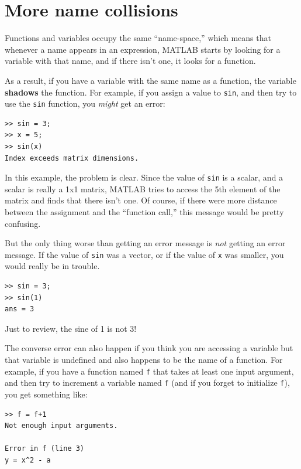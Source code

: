 \documentclass[
]{book}
\begin{document}
\section{More name collisions}

Functions and variables occupy the same ``name-space,'' which means
that whenever a name appears in an expression, MATLAB starts by looking
for a variable with that name, and if there isn't one, it looks for
a function.

As a result, if you have a variable with the same name as a function,
the variable {\bf shadows} the function.  For example, if you assign
a value to {\tt sin}, and then try to use the {\tt sin} function, you
{\em might} get an error:

\begin{verbatim}
>> sin = 3;
>> x = 5;
>> sin(x)
Index exceeds matrix dimensions.
\end{verbatim}

In this example, the problem is clear.  Since the value of {\tt sin}
is a scalar, and a scalar is really a 1x1 matrix, MATLAB tries to
access the 5th element of the matrix and finds that there isn't one.
Of course, if there were more distance between the assignment
and the ``function call,'' this message would be pretty confusing.

But the only thing worse than getting an error message is {\em not}
getting an error message.  If the value of {\tt sin} was a vector,
or if the value of {\tt x} was smaller, you would really
be in trouble.

\begin{verbatim}
>> sin = 3;
>> sin(1)
ans = 3
\end{verbatim}

Just to review, the sine of 1 is not 3!

The converse error can also happen if you 
think you are accessing a variable but that variable is undefined and 
also happens to be the name of a function.
For example, if you have a function named {\tt f} that takes at least one
input argument, and then
try to increment a variable named {\tt f} (and if you forget to
initialize {\tt f}), you get something like:

\begin{verbatim}
>> f = f+1
Not enough input arguments.

Error in f (line 3)
y = x^2 - a
\end{verbatim}
\end{document}
